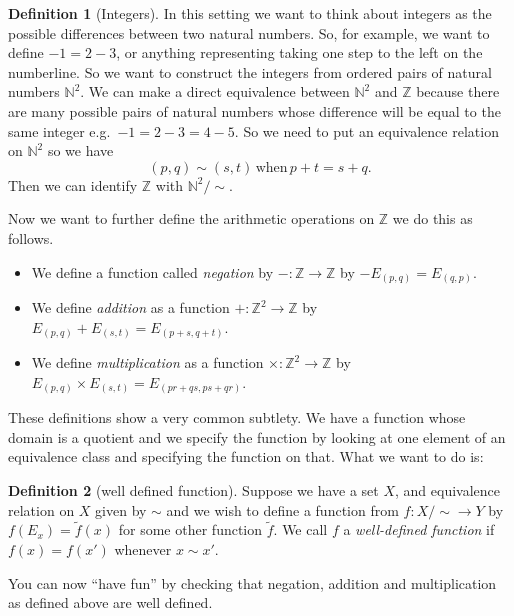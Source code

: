\documentclass[
]{book}
\theoremstyle{definition}
\newtheorem{definition}{Definition}[chapter]
\theoremstyle{definition}
\theoremstyle{definition}
\theoremstyle{definition}
\theoremstyle{remark}
\begin{document}
\begin{definition}[Integers]

In this setting we want to think about integers as the possible differences between two natural numbers. So, for example, we want to define \(-1 = 2-3\), or anything representing taking one step to the left on the numberline. So we want to construct the integers from ordered pairs of natural numbers \(\mathbb{N}^2\). We can make a direct equivalence between \(\mathbb{N}^2\) and \(\mathbb{Z}\) because there are many possible pairs of natural numbers whose difference will be equal to the same integer e.g.~\(-1=2-3=4-5\). So we need to put an equivalence relation on \(\mathbb{N}^2\) so we have
\[ (p, q) \sim (s,t) \, \mbox{when} \, p+t=s+q.  \]
Then we can identify \(\mathbb{Z}\) with \(\mathbb{N}^2/\sim\).

Now we want to further define the arithmetic operations on \(\mathbb{Z}\) we do this as follows.

\begin{itemize}
\item
  We define a function called \emph{negation} by \(-:\mathbb{Z} \rightarrow \mathbb{Z}\) by \(-E_{(p,q)} = E_{(q,p)}\).
\item
  We define \emph{addition} as a function \(+: \mathbb{Z}^2 \rightarrow \mathbb{Z}\) by \(E_{(p,q)} + E_{(s,t)} = E_{(p+s, q+t)}\).
\item
  We define \emph{multiplication} as a function \(\times : \mathbb{Z}^2 \rightarrow \mathbb{Z}\) by \(E_{(p,q)} \times E_{(s,t)} = E_{(pr+qs, ps+qr)}\).
\end{itemize}

\end{definition}

These definitions show a very common subtlety. We have a function whose domain is a quotient and we specify the function by looking at one element of an equivalence class and specifying the function on that. What we want to do is:

\begin{definition}[well defined function]
Suppose we have a set \(X\), and equivalence relation on \(X\) given by \(\sim\) and we wish to define a function from \(f: X/\sim \rightarrow Y\) by \(f(E_x) = \tilde{f}(x)\) for some other function \(\tilde{f}\). We call \(f\) a \emph{well-defined function} if \(f(x) = f(x')\) whenever \(x \sim x'\).
\end{definition}

You can now ``have fun'' by checking that negation, addition and multiplication as defined above are well defined.
\end{document}
